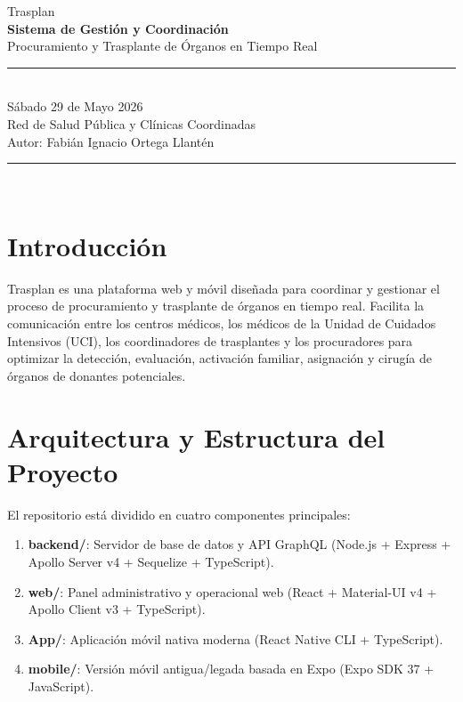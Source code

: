 \documentclass[11pt, a4paper]{article}
\begin{document}
\begin{center}
    {\color{TitleBlue}\LARGE\sffamily Trasplan}\\[0.3cm]
    {\Huge\bfseries Sistema de Gestión y Coordinación}\\[0.2cm]
    {\Large Procuramiento y Trasplante de Órganos en Tiempo Real}\\[0.6cm]
    \rule{\textwidth}{0.8pt}\\[0.4cm]
    {\large\sffamily Sábado 29 de Mayo 2026}\\[0.2cm]
    {\large\sffamily Red de Salud Pública y Clínicas Coordinadas}\\[0.2cm]
    {\large\sffamily Autor: Fabián Ignacio Ortega Llantén}\\[0.4cm]
    \rule{\textwidth}{0.8pt}\\[0.8cm]
\end{center}

\section{Introducción}
Trasplan es una plataforma web y móvil diseñada para coordinar y gestionar el proceso de procuramiento y trasplante de órganos en tiempo real. Facilita la comunicación entre los centros médicos, los médicos de la Unidad de Cuidados Intensivos (UCI), los coordinadores de trasplantes y los procuradores para optimizar la detección, evaluación, activación familiar, asignación y cirugía de órganos de donantes potenciales.

\section{Arquitectura y Estructura del Proyecto}
El repositorio está dividido en cuatro componentes principales:
\begin{enumerate}
    \item \textbf{backend/}: Servidor de base de datos y API GraphQL (Node.js + Express + Apollo Server v4 + Sequelize + TypeScript).
    \item \textbf{web/}: Panel administrativo y operacional web (React + Material-UI v4 + Apollo Client v3 + TypeScript).
    \item \textbf{App/}: Aplicación móvil nativa moderna (React Native CLI + TypeScript).
    \item \textbf{mobile/}: Versión móvil antigua/legada basada en Expo (Expo SDK 37 + JavaScript).
\end{enumerate}
\end{document}
